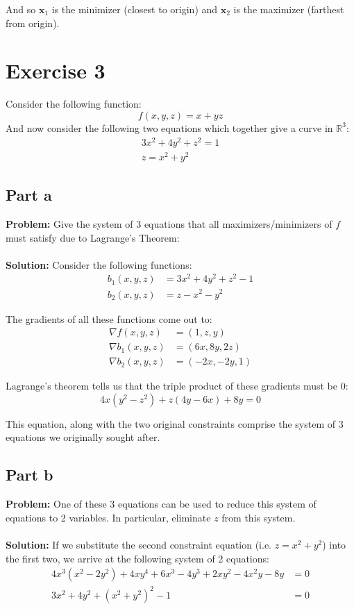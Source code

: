 \documentclass{article}
\begin{document}
And so $\mathbf x_1$ is the minimizer (closest to origin) and $\mathbf x_2$ is the maximizer (farthest from origin).

\section*{Exercise 3}
Consider the following function:
$$f(x,y,z)=x+yz$$
And now consider the following two equations which together give a curve in $\mathbb R^3$:
\begin{gather*}
  3x^2+4y^2+z^2=1\\
  z=x^2+y^2
\end{gather*}
\subsection*{Part a}
\textbf{Problem:} Give the system of 3 equations that all maximizers/minimizers of $f$ must satisfy due to Lagrange's Theorem:
\\\\
\textbf{Solution:} Consider the following functions:
\begin{align*}
  b_1(x,y,z)&=3x^2+4y^2+z^2-1\\
  b_2(x,y,z)&=z-x^2-y^2
\end{align*}

The gradients of all these functions come out to:
\begin{align*}
  \nabla f(x,y,z)&=(1,z,y)\\
  \nabla b_1(x,y,z)&=(6x,8y,2z)\\
  \nabla b_2(x,y,z)&=(-2x,-2y,1)
\end{align*}

Lagrange's theorem tells us that the triple product of these gradients must be 0:
$$4x(y^2-z^2)+z(4y-6x)+8y=0$$

This equation, along with the two original constraints comprise the system of 3 equations we originally sought after.

\subsection*{Part b}
\textbf{Problem:} One of these 3 equations can be used to reduce this system of equations to 2 variables. In particular, eliminate $z$ from this system.
\\\\
\textbf{Solution:} If we substitute the second constraint equation (i.e. $z=x^2+y^2$) into the first two, we arrive at the following system of 2 equations:
\begin{align*}
  4x^3(x^2-2y^2)+4xy^4+6x^3-4y^3+2xy^2-4x^2y-8y&=0\\
  3x^2+4y^2+(x^2+y^2)^2-1&=0
\end{align*}
\end{document}
